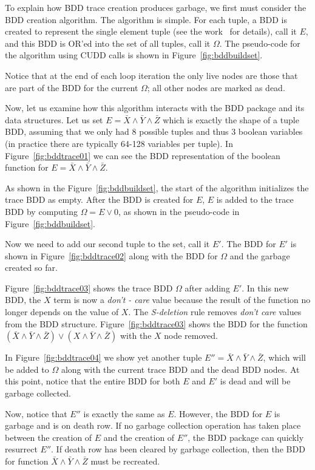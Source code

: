 {To explain how BDD trace creation produces garbage, we first must consider the BDD creation algorithm.  The algorithm is simple.  For each tuple, a BDD is created to represent the single element tuple (see the work~\cite{price:06:cal} for details), call it $E$, and this BDD is OR'ed into the set of all tuples, call it $\Omega$.  The pseudo-code for the algorithm using CUDD calls is shown in Figure~\ref{fig:bddbuildset}.

Notice that at the end of each loop iteration the only live nodes are those that are part of the BDD for the current $\Omega$; all other nodes are marked as dead.

Now, let us examine how this algorithm interacts with the BDD package and its data structures.  Let us set $E = \bar{X}\land\bar{Y}\land\bar{Z}$ which is exactly the shape of a tuple BDD, assuming that we only had 8 possible tuples and thus 3 boolean variables (in practice there are typically 64-128 variables per tuple). In Figure~\ref{fig:bddtrace01} we can see the BDD representation of the boolean function for $E = \bar{X}\land\bar{Y}\land\bar{Z}$.

As shown in the Figure~\ref{fig:bddbuildset}, the start of the algorithm initializes the trace BDD as empty.  After the BDD is created for $E$, $E$ is added to the trace BDD by computing $\Omega = E \lor 0$, as shown in the pseudo-code in Figure~\ref{fig:bddbuildset}.

Now we need to add our second tuple to the set, call it $E'$.  The BDD for $E'$ is shown in Figure~\ref{fig:bddtrace02} along with the BDD for $\Omega$ and the garbage created so far.

Figure~\ref{fig:bddtrace03} shows the trace BDD $\Omega$ after adding $E'$.  In this new BDD, the $X$ term is now a \textit{don't - care} value because the result of the function no longer depends on the value of $X$.  The \textit{S-deletion} rule removes \textit{don't care} values from the BDD structure.  Figure~\ref{fig:bddtrace03} shows the BDD for the function $(\bar{X}\land\bar{Y}\land\bar{Z})\lor(X\land\bar{Y}\land\bar{Z})$ with the $X$ node removed.

In Figure~\ref{fig:bddtrace04} we show yet another tuple $E'' = \bar{X}\land\bar{Y}\land\bar{Z}$, which will be added to $\Omega$ along with the current trace BDD and the dead BDD nodes.  At this point, notice that the entire BDD for both $E$ and $E'$ is dead and will be garbage collected.

Now, notice that $E''$ is exactly the same as $E$.  However, the BDD for $E$ is garbage and is on death row.  If no garbage collection operation has taken place between the creation of $E$ and the creation of $E''$, the BDD package can quickly resurrect $E''$.  If death row has been cleared by garbage collection, then the BDD for function $\bar{X}\land\bar{Y}\land\bar{Z}$ must be recreated.

}
